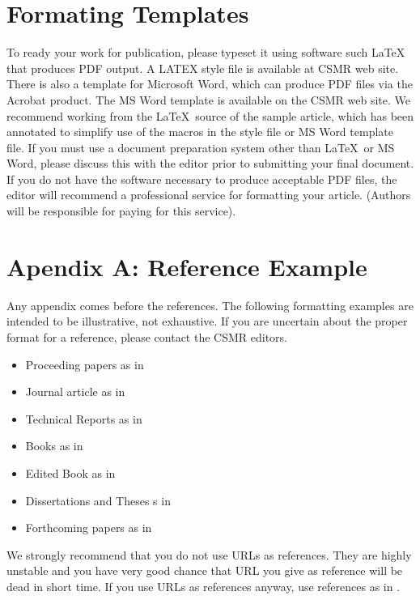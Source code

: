 \documentclass[twoside, 11pt, a4paper]{article}
\begin{document}
\section{Formating Templates}

To ready your work for publication, please typeset it using software such LaTeX that produces PDF output. A LATEX style file is available at CSMR web site. There is also a template for Microsoft Word, which can produce PDF files via the Acrobat product. The MS Word template is available on the CSMR web site. We recommend working from the \LaTeX\ source of the sample article, which has been annotated to simplify use of the macros in the style file or MS Word template file. If you must use a document preparation system other than \LaTeX\ or MS Word, please discuss this with the editor prior to submitting your final document. If you do not have the software necessary to produce acceptable PDF files, the editor will recommend a professional service for formatting your article. (Authors will be responsible for paying for this service). 


\newpage

\section*{Apendix A: Reference Example}
Any appendix comes before the references.  The following formatting examples are intended to be illustrative, 
not exhaustive. If you are uncertain about the proper format for a reference, please contact the CSMR editors. 
\begin{itemize}
\item Proceeding papers as in \cite{4}
\item Journal article as in \cite{3}
\item Technical Reports as in \cite{5}
\item Books as in \cite{1}
\item Edited Book as in \cite{2}
\item Dissertations and Theses s in \cite{6}
\item Forthcoming papers as in \cite{7}
\end{itemize}

We strongly recommend that you do not use URLs as references. They are highly unstable and you have very good 
chance that URL you give as reference will be dead in short time. If you use URLs as references anyway, use references
as in \cite{8}.

\vskip 0.2in


\end{document}

